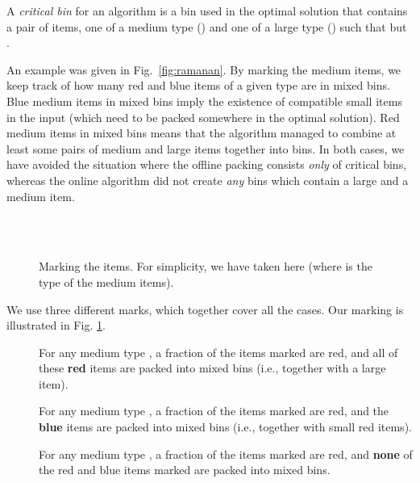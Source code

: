 \begin{definition}
A \emph{critical bin} for an {\EHarm} algorithm is a bin used in the optimal solution that contains a pair of items,  one of a medium type  () and one of a large type  () such that  but .
\end{definition}
An example was given in Fig.~\ref{fig:ramanan}.
By marking the medium items, we keep track of how many red and blue items of a given type  are in mixed bins.
Blue medium items in mixed bins imply the existence of compatible small items in the input
(which need to be packed somewhere in the optimal solution).
Red medium items in mixed bins means that the algorithm managed to combine at least some pairs of medium and large items
together into bins. In both cases, we have avoided the situation where the offline packing consists \emph{only} of
critical bins, whereas the online algorithm did not create \emph{any} bins which contain a large and a medium item.
\begin{figure}[t]
	\begin{center}
	\\
	\\
	\end{center}
	\caption{Marking the items.
	For simplicity, we have taken  here (where  is the type of the medium items).
	\label{fig:marking}}
\end{figure}
We use three different marks, which together cover all the cases. Our marking is illustrated in Fig. \ref{fig:marking}. 
\begin{description}
\item[] For any medium type , a fraction  of the items marked 
are red, and all of these
\textbf{red} items are packed into mixed bins (i.e., together with a large item).
\item[] For any medium type , a fraction  of the items marked 
are red, and the \textbf{blue} items are packed into mixed bins (i.e., together with small red items).
\item[] For any medium type , a fraction  of the items marked 
are red, and \textbf{none} of the red and blue items marked  are packed into mixed bins.
\end{description}

